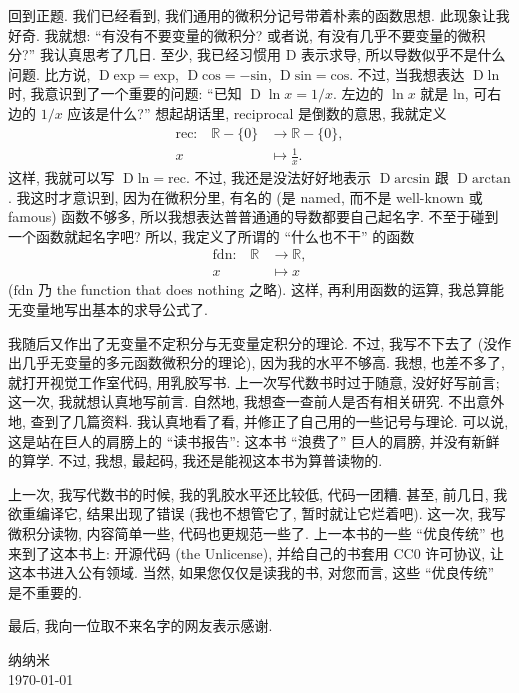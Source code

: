 回到正题. 我们已经看到, 我们通用的微积分记号带着朴素的函数思想. 此现象让我好奇. 我就想: ``有没有不要变量的微积分? 或者说, 有没有几乎不要变量的微积分?'' 我认真思考了几日. 至少, 我已经习惯用 $\mathrm{D}$ 表示求导, 所以导数似乎不是什么问题. 比方说, $\operatorname{D} \mathrm{exp} = \mathrm{exp}$, $\operatorname{D} \mathrm{cos} = -\mathrm{sin}$, $\operatorname{D} \mathrm{sin} = \mathrm{cos}$. 不过, 当我想表达 $\operatorname{D} \mathrm{ln}$ 时, 我意识到了一个重要的问题: ``已知 $\operatorname{D} \ln {x} = 1/x$. 左边的 $\ln {x}$ 就是 $\mathrm{ln}$, 可右边的 $1/x$ 应该是什么?'' 想起胡话里, reciprocal 是倒数的意思, 我就定义
\begin{align*}
    \text{$\mathrm{rec}$:} \quad
    \mathbb{R} - \{ 0 \} & \to \mathbb{R} - \{ 0 \}, \\
    x                    & \mapsto \frac{1}{x}.
\end{align*}
这样, 我就可以写 $\operatorname{D} \mathrm{ln} = \mathrm{rec}$. 不过, 我还是没法好好地表示 $\operatorname{D} \mathrm{arcsin}$ 跟 $\operatorname{D} \mathrm{arctan}$. 我这时才意识到, 因为在微积分里, 有名的 (是 named, 而不是 well-known 或 famous) 函数不够多, 所以我想表达普普通通的导数都要自己起名字. 不至于碰到一个函数就起名字吧? 所以, 我定义了所谓的 ``什么也不干'' 的函数
\begin{align*}
    \text{$\mathrm{fdn}$:} \quad
    \mathbb{R} & \to \mathbb{R}, \\
    x          & \mapsto x
\end{align*}
($\mathrm{fdn}$ 乃 the function that does nothing 之略). 这样, 再利用函数的运算, 我总算能无变量地写出基本的求导公式了.

我随后又作出了无变量不定积分与无变量定积分的理论. 不过, 我写不下去了 (没作出几乎无变量的多元函数微积分的理论), 因为我的水平不够高. 我想, 也差不多了, 就打开视觉工作室代码, 用乳胶写书. 上一次写代数书时过于随意, 没好好写前言; 这一次, 我就想认真地写前言. 自然地, 我想查一查前人是否有相关研究. 不出意外地, 查到了几篇资料. 我认真地看了看, 并修正了自己用的一些记号与理论. 可以说, 这是站在巨人的肩膀上的 ``读书报告'': 这本书 ``浪费了'' 巨人的肩膀, 并没有新鲜的算学. 不过, 我想, 最起码, 我还是能视这本书为算普读物的.

上一次, 我写代数书的时候, 我的乳胶水平还比较低, 代码一团糟. 甚至, 前几日, 我欲重编译它, 结果出现了错误 (我也不想管它了, 暂时就让它烂着吧). 这一次, 我写微积分读物, 内容简单一些, 代码也更规范一些了. 上一本书的一些 ``优良传统'' 也来到了这本书上: 开源代码 (the Unlicense), 并给自己的书套用 CC0 许可协议, 让这本书进入公有领域. 当然, 如果您仅仅是读我的书, 对您而言, 这些 ``优良传统'' 是不重要的.

最后, 我向一位取不来名字的网友表示感谢.

\begin{flushright}
    纳纳米\\
    \today
\end{flushright}
